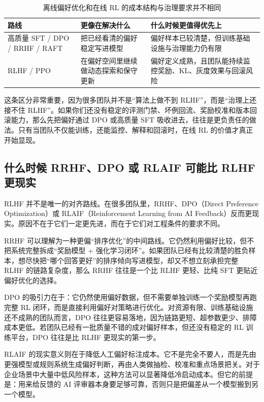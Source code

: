 \begin{table}[H]
\centering
\small
\begin{tabularx}{\textwidth}{>{\raggedright\arraybackslash}p{3.1cm}>{\raggedright\arraybackslash}p{3.1cm}>{\raggedright\arraybackslash}X}
\toprule
\textbf{路线} & \textbf{更像在解决什么} & \textbf{什么时候更值得优先上} \\
\midrule
高质量 SFT / DPO / RRHF / RAFT & 把已经看清的偏好稳定写进模型 & 偏好样本已较清楚，但训练基础设施与治理能力仍有限 \\
RLHF / PPO & 在偏好空间里继续做动态探索和保守更新 & 偏好定义成熟，且团队能持续监控奖励、KL、灰度效果与回滚风险 \\
\bottomrule
\end{tabularx}
\caption{离线偏好优化和在线 RL 的成本结构与治理要求并不相同}
\label{tab:offline-vs-online-alignment}
\end{table}

这条区分非常重要，因为很多团队并不是“算法上做不到 RLHF”，而是“治理上还接不住 RLHF”。如果你们还没有稳定的评测门禁、坏例回流、奖励校准和版本回滚能力，那么先把偏好通过 DPO 或高质量 SFT 吸收进去，往往是更负责任的做法。只有当团队不仅能训练，还能监控、解释和回滚时，在线 RL 的价值才真正开始显现。

\subsection{什么时候 RRHF、DPO 或 RLAIF 可能比 RLHF 更现实}
RLHF 并不是唯一的对齐路线。在很多团队里，RRHF、DPO（Direct Preference Optimization）或 RLAIF（Reinforcement Learning from AI Feedback）反而更现实。原因不在于它们一定更先进，而在于它们对工程条件的要求不同。

RRHF 可以理解为一种更偏“排序优化”的中间路线。它仍然利用偏好比较，但不把系统完整拆成“奖励模型 + 强化学习闭环”。如果团队已经有比较清楚的胜负样本，想尽快把“哪个回答更好”的排序倾向写进模型，却又不想立刻承担完整 RLHF 的链路复杂度，那么 RRHF 往往是一个比 RLHF 更轻、比纯 SFT 更贴近偏好优化的选择。

DPO 的吸引力在于：它仍然使用偏好数据，但不需要单独训练一个奖励模型再跑完整 RL 闭环，而是直接利用偏好对策略进行优化。对资源有限、训练基础设施还不成熟的团队而言，DPO 往往更容易落地，因为链路更短、超参数更少、排障成本更低。若团队已经有一批质量不错的成对偏好样本，但还没有稳定的 RL 训练平台，DPO 往往是比 RLHF 更现实的第一步。

RLAIF 的现实意义则在于降低人工偏好标注成本。它不是完全不要人，而是先由更强模型或规则系统生成偏好判断，再由人类做抽检、校准和重点场景把关。对于企业场景中大量中低风险样本，这种方法可以显著降低冷启动成本。但它的前提是：用来给反馈的 AI 评审器本身要足够可靠，否则只是把偏差从一个模型搬到另一个模型。

